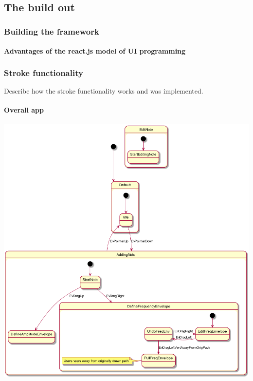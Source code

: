 \documentclass[a4paper,12pt]{article}
\begin{document}
\subsection{The build out}
\label{sec:org9212529}
\subsubsection{Building the framework}
\label{sec:orgc6f06ed}
\paragraph{Advantages of the react.js model of UI programming}
\label{sec:org0e83cb3}
\subsubsection{Stroke functionality}
\label{sec:org96f80ab}
Describe how the stroke functionality works and was implemented.
\paragraph{Overall app}
\label{sec:org581a076}

\begin{center}
\includegraphics[width=.9\linewidth]{tryout.png}
\end{center}
\end{document}
